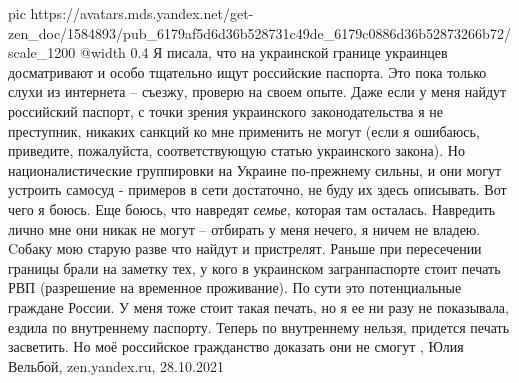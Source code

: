 \ifcmt
  pic https://avatars.mds.yandex.net/get-zen_doc/1584893/pub_6179af5d6d36b528731c49de_6179c0886d36b52873266b72/scale_1200
  @width 0.4
\fi
Я писала, что на украинской границе украинцев досматривают и особо тщательно
ищут российские паспорта. Это пока только слухи из интернета – съезжу, проверю
на своем опыте. Даже если у меня найдут российский паспорт, с точки зрения
украинского законодательства я не преступник, никаких санкций ко мне применить
не могут (если я ошибаюсь, приведите, пожалуйста, соответствующую статью
украинского закона). Но националистические группировки на Украине по-прежнему
сильны, и они могут устроить самосуд - примеров в сети достаточно, не буду их
здесь описывать. Вот чего я боюсь.  Еще боюсь, что навредят \emph{семье},
которая там осталась. Навредить лично мне они никак не могут – отбирать у меня
нечего, я ничем не владею. Cобаку мою старую разве что найдут и пристрелят.
Раньше при пересечении границы брали на заметку тех, у кого в украинском
загранпаспорте стоит печать РВП (разрешение на временное проживание). По сути
это потенциальные граждане России. У меня тоже стоит такая печать, но я ее ни
разу не показывала, ездила по внутреннему паспорту. Теперь по внутреннему
нельзя, придется печать засветить. Но моё российское гражданство доказать они
не смогут
, Юлия Вельбой, zen.yandex.ru, 28.10.2021
